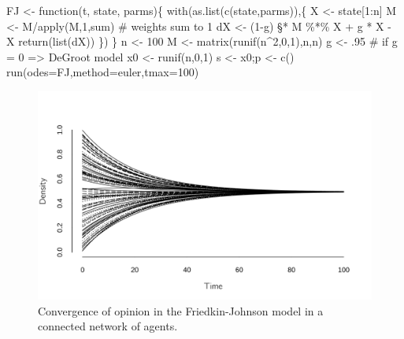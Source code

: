 \documentclass[
  a4paper,
  DIV=11,
  numbers=noendperiod]{scrreprt}
\newenvironment{Shaded}{\begin{snugshade}}{\end{snugshade}}
\newcommand{\AttributeTok}[1]{\textcolor[rgb]{0.40,0.45,0.13}{#1}}
\newcommand{\CommentTok}[1]{\textcolor[rgb]{0.37,0.37,0.37}{#1}}
\newcommand{\ControlFlowTok}[1]{\textcolor[rgb]{0.00,0.23,0.31}{#1}}
\newcommand{\DecValTok}[1]{\textcolor[rgb]{0.68,0.00,0.00}{#1}}
\newcommand{\FunctionTok}[1]{\textcolor[rgb]{0.28,0.35,0.67}{#1}}
\newcommand{\NormalTok}[1]{\textcolor[rgb]{0.00,0.23,0.31}{#1}}
\newcommand{\OtherTok}[1]{\textcolor[rgb]{0.00,0.23,0.31}{#1}}
\newcommand{\SpecialCharTok}[1]{\textcolor[rgb]{0.37,0.37,0.37}{#1}}
\newcommand{\StringTok}[1]{\textcolor[rgb]{0.13,0.47,0.30}{#1}}
\begin{document}
\begin{Shaded}
\begin{Highlighting}[]
\NormalTok{FJ }\OtherTok{\textless{}{-}} \ControlFlowTok{function}\NormalTok{(t, state, parms)\{}
  \FunctionTok{with}\NormalTok{(}\FunctionTok{as.list}\NormalTok{(}\FunctionTok{c}\NormalTok{(state,parms)),\{}
\NormalTok{    X }\OtherTok{\textless{}{-}}\NormalTok{ state[}\DecValTok{1}\SpecialCharTok{:}\NormalTok{n]}
\NormalTok{    M }\OtherTok{\textless{}{-}}\NormalTok{ M}\SpecialCharTok{/}\FunctionTok{apply}\NormalTok{(M,}\DecValTok{1}\NormalTok{,sum) }\CommentTok{\# weights sum to 1}
\NormalTok{    dX }\OtherTok{\textless{}{-}}\NormalTok{ (}\DecValTok{1}\SpecialCharTok{{-}}\NormalTok{g) §}\SpecialCharTok{*}\NormalTok{ M }\SpecialCharTok{\%*\%}\NormalTok{ X  }\SpecialCharTok{+}\NormalTok{ g }\SpecialCharTok{*}\NormalTok{ X }\SpecialCharTok{{-}}\NormalTok{ X}
    \FunctionTok{return}\NormalTok{(}\FunctionTok{list}\NormalTok{(dX))}
\NormalTok{  \})}
\NormalTok{\}}
\NormalTok{n }\OtherTok{\textless{}{-}} \DecValTok{100}
\NormalTok{M }\OtherTok{\textless{}{-}} \FunctionTok{matrix}\NormalTok{(}\FunctionTok{runif}\NormalTok{(n}\SpecialCharTok{\^{}}\DecValTok{2}\NormalTok{,}\DecValTok{0}\NormalTok{,}\DecValTok{1}\NormalTok{),n,n)}
\NormalTok{g }\OtherTok{\textless{}{-}}\NormalTok{ .}\DecValTok{95} \CommentTok{\# if g  = 0 =\textgreater{} DeGroot model}
\NormalTok{x0 }\OtherTok{\textless{}{-}} \FunctionTok{runif}\NormalTok{(n,}\DecValTok{0}\NormalTok{,}\DecValTok{1}\NormalTok{)}
\NormalTok{s }\OtherTok{\textless{}{-}}\NormalTok{ x0;p  }\OtherTok{\textless{}{-}} \FunctionTok{c}\NormalTok{() }
\FunctionTok{run}\NormalTok{(}\AttributeTok{odes=}\NormalTok{FJ,}\AttributeTok{method=}\StringTok{\textquotesingle{}euler\textquotesingle{}}\NormalTok{,}\AttributeTok{tmax=}\DecValTok{100}\NormalTok{)}
\end{Highlighting}
\end{Shaded}

\begin{figure}

{\centering \includegraphics{media/ch7/fig-ch7-img7-old-95.png}

}

\caption{\label{fig-ch7-img7-old-95}Convergence of opinion in the
Friedkin-Johnson model in a connected network of agents.}

\end{figure}
\end{document}
